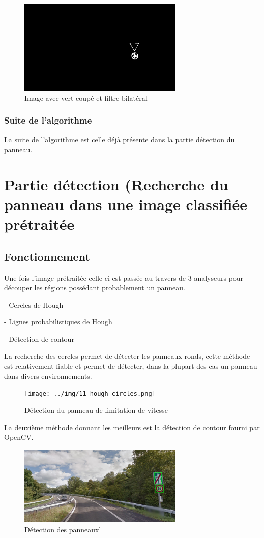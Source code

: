 \documentclass[a4paper,10pt,openany,oneside]{report}
\begin{document}
\begin{figure}[!h]
\centering
\includegraphics[width=0.7\textwidth]{../img/84-redblue.png}
\caption{Image avec vert coupé et filtre bilatéral}
\end{figure}

\subsubsection{Suite de l'algorithme}
La suite de l'algorithme est celle déjà présente dans la partie détection du panneau.


\section{Partie détection (Recherche du panneau dans une image classifiée prétraitée}
\subsection{Fonctionnement}
Une fois l'image prétraitée celle-ci est passée au travers de 3 analyseurs pour découper les régions possédant probablement un panneau.
\begin{itemsize}
\item[-] Cercles de Hough
\item[-] Lignes probabilistiques de Hough
\item[-] Détection de contour
\end{itemsize}
La recherche des cercles permet de détecter les panneaux ronds, cette méthode est relativement fiable et permet de détecter, dans la plupart des cas un panneau dans divers environnements.
\begin{figure}[!h]
\centering
\texttt{[image: ../img/11-hough\_circles.png]}
\caption{Détection du panneau de limitation de vitesse}
\end{figure}

La deuxième méthode donnant les meilleurs est la détection de contour fourni par OpenCV.
\begin{figure}[!h]
\centering
\includegraphics[width=0.7\textwidth]{../img/10-contour.png}
\caption{Détection des panneauxl}
\end{figure}
\end{document}
